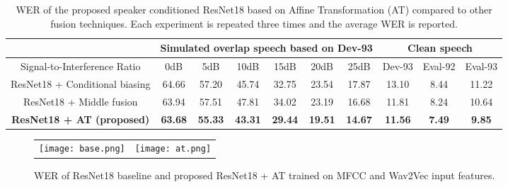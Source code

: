 \documentclass{article}
\begin{document}
\begin{table*}[t]
\setlength{\extrarowheight}{4pt}
\begin{center}
\vspace{-0.6cm}
\caption{ WER of the proposed speaker conditioned ResNet18 based on Affine Transformation (AT) compared to other fusion techniques. Each experiment is repeated three times and the average WER is reported.}
\begin{tabular}{ |c|c|c|c|c|c|c|c|c|c| }

\cline{2-10}

\multicolumn{1}{c|}{} & \multicolumn{6}{c|}{Simulated overlap speech based on Dev-93} &\multicolumn{3}{c|}{Clean speech} \\ 
\cline{3-6} \cline{7-9} 
\hline
Signal-to-Interference Ratio & 0dB & 5dB & 10dB & 15dB & 20dB & 25dB & Dev-93 & Eval-92 & Eval-93 \\
\hline
ResNet18 + Conditional biasing  & 64.66&	57.20&	45.74&	32.75&	23.54&	17.87&	13.10&	8.44&	11.22\\
ResNet18 + Middle fusion & 63.94&	57.51&	47.81&	34.02&	23.19&	16.68&	11.81&	8.24&	10.64 \\
\textbf{ResNet18 + AT (proposed)}& \textbf{63.68}&	\textbf{55.33}&	\textbf{43.31}&\textbf{29.44}&	\textbf{19.51}&\textbf{14.67}&\textbf{11.56}&\textbf{7.49}&	\textbf{9.85}\\
\hline
\end{tabular}
\label{tab:com}
\end{center}
\end{table*}




\begin{figure*}
\centering
\begin{tabular}{cc}
\texttt{[image: base.png]}&
\hspace{1.5cm}
\texttt{[image: at.png]} 
\end{tabular}
\vspace{-0.2cm}
\label{figur}\caption{ WER of ResNet18 baseline and proposed ResNet18 + AT trained on MFCC and Wav2Vec input features.}
\vspace{-0.2cm}
\label{fig:wav2vec}
\end{figure*}
\end{document}
